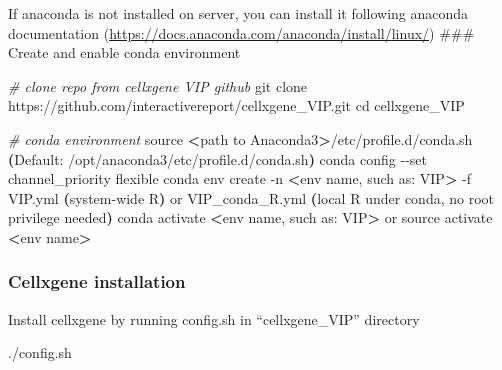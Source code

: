 \documentclass[
]{article}
\newenvironment{Shaded}{\begin{snugshade}}{\end{snugshade}}
\newcommand{\AttributeTok}[1]{\textcolor[rgb]{0.77,0.63,0.00}{#1}}
\newcommand{\BuiltInTok}[1]{#1}
\newcommand{\CommentTok}[1]{\textcolor[rgb]{0.56,0.35,0.01}{\textit{#1}}}
\newcommand{\ErrorTok}[1]{\textcolor[rgb]{0.64,0.00,0.00}{\textbf{#1}}}
\newcommand{\ExtensionTok}[1]{#1}
\newcommand{\FunctionTok}[1]{\textcolor[rgb]{0.00,0.00,0.00}{#1}}
\newcommand{\KeywordTok}[1]{\textcolor[rgb]{0.13,0.29,0.53}{\textbf{#1}}}
\newcommand{\NormalTok}[1]{#1}
\newcommand{\OperatorTok}[1]{\textcolor[rgb]{0.81,0.36,0.00}{\textbf{#1}}}
\newcommand{\SpecialCharTok}[1]{\textcolor[rgb]{0.00,0.00,0.00}{#1}}
\newcommand{\VariableTok}[1]{\textcolor[rgb]{0.00,0.00,0.00}{#1}}
\begin{document}
If anaconda is not installed on server, you can install it following anaconda documentation (\url{https://docs.anaconda.com/anaconda/install/linux/})
\#\#\# Create and enable conda environment

\begin{Shaded}
\begin{Highlighting}[]
\CommentTok{\# clone repo from cellxgene VIP github}
\FunctionTok{git}\NormalTok{ clone https://github.com/interactivereport/cellxgene\_VIP.git}
\BuiltInTok{cd}\NormalTok{ cellxgene\_VIP}

\CommentTok{\# conda environment}
\BuiltInTok{source} \OperatorTok{\textless{}}\NormalTok{path to Anaconda3}\OperatorTok{\textgreater{}}\NormalTok{/etc/profile.d/conda.sh }\ErrorTok{(}\ExtensionTok{Default:}\NormalTok{ /opt/anaconda3/etc/profile.d/conda.sh}\KeywordTok{)}
\ExtensionTok{conda}\NormalTok{ config }\AttributeTok{{-}{-}set}\NormalTok{ channel\_priority flexible}
\ExtensionTok{conda}\NormalTok{ env create }\AttributeTok{{-}n} \OperatorTok{\textless{}}\NormalTok{env name, such as: VIP}\OperatorTok{\textgreater{}}\NormalTok{ {-}f VIP.yml }\ErrorTok{(}\ExtensionTok{system{-}wide}\NormalTok{ R}\KeywordTok{)} \ExtensionTok{or}\NormalTok{ VIP\_conda\_R.yml }\ErrorTok{(}\BuiltInTok{local} \VariableTok{R} \VariableTok{under} \VariableTok{conda}\NormalTok{, }\VariableTok{no} \VariableTok{root} \VariableTok{privilege} \VariableTok{needed}\KeywordTok{)}
\ExtensionTok{conda}\NormalTok{ activate }\OperatorTok{\textless{}}\NormalTok{env name, such as: VIP}\OperatorTok{\textgreater{}}
\ExtensionTok{or}
\BuiltInTok{source}\NormalTok{ activate }\OperatorTok{\textless{}}\NormalTok{env name}\OperatorTok{\textgreater{}}
\end{Highlighting}
\end{Shaded}

\hypertarget{cellxgene-installation}{%
\subsubsection{Cellxgene installation}\label{cellxgene-installation}}

Install cellxgene by running config.sh in ``cellxgene\_VIP'' directory

\begin{Shaded}
\begin{Highlighting}[]
\NormalTok{.}\SpecialCharTok{/}\NormalTok{config.sh}
\end{Highlighting}
\end{Shaded}
\end{document}
